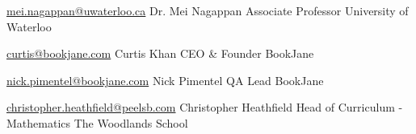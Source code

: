

\begin{cventries}

  \cventry
    {\href{mailto:mei.nagappan@uwaterloo.ca}{mei.nagappan@uwaterloo.ca}} %
    {Dr. Mei Nagappan} %
    {Associate Professor} %
    {University of Waterloo} %

  \cventry
    {\href{mailto:curtis@bookjane.com}{curtis@bookjane.com}} %
    {Curtis Khan} %
    {CEO \& Founder} %
    {BookJane} %

  \cventry
    {\href{mailto:nick.pimentel@bookjane.com}{nick.pimentel@bookjane.com}} %
    {Nick Pimentel} %
    {QA Lead} %
    {BookJane} %

  \cventry
    {\href{mailto:christopher.heathfield@peelsb.com}{christopher.heathfield@peelsb.com}} %
    {Christopher Heathfield} %
    {Head of Curriculum - Mathematics} %
    {The Woodlands School} %


\end{cventries}
